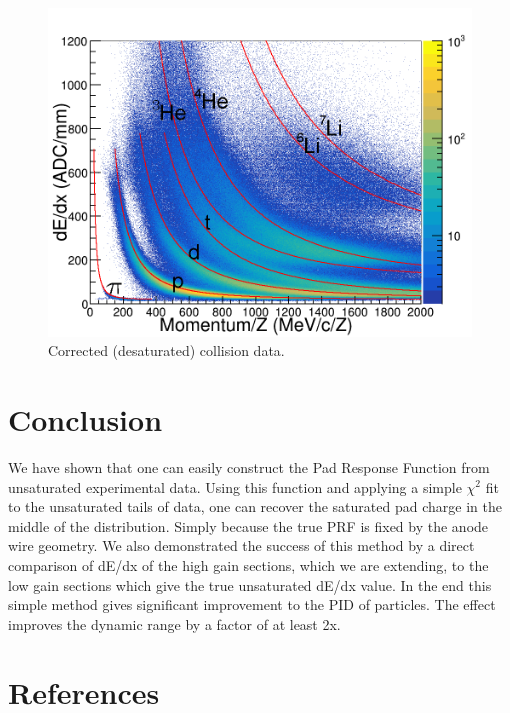 \documentclass[review]{elsarticle}
\begin{document}
\begin{figure}[ht]
\label{fig:data_desat}
\includegraphics[width=\linewidth]{data_desat}
\caption{Corrected (desaturated) collision data.}
\end{figure}


\section{Conclusion}
We have shown that one can easily construct the Pad Response Function from unsaturated experimental data. Using this function and applying a simple $\chi^2$ fit to the unsaturated tails of data, one can recover the saturated pad charge in the middle of the distribution. Simply because the true PRF is fixed by the anode wire geometry. We also demonstrated the success of this method by a direct comparison of dE/dx of the high gain sections, which we are extending, to the low gain sections which give the true unsaturated dE/dx value. In the end this simple method gives significant improvement to the PID of particles. The effect improves the dynamic range by a factor of at least 2x. 
\section*{References}


\end{document}
